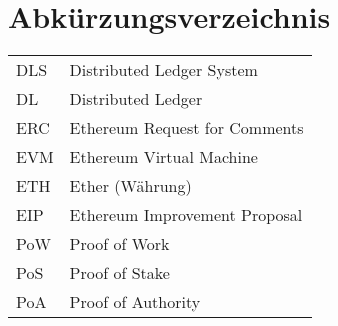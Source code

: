 
\section{Abkürzungsverzeichnis}

\begin{longtable}{p{6 cm}p{9 cm}}
    DLS & Distributed Ledger System \\
    DL & Distributed Ledger \\
    ERC & Ethereum Request for Comments \\
    EVM & Ethereum Virtual Machine \\
    ETH & Ether (Währung) \\
    EIP & Ethereum Improvement Proposal \\
    PoW & Proof of Work \\
    PoS & Proof of Stake \\
    PoA & Proof of Authority \\
\end{longtable}

   